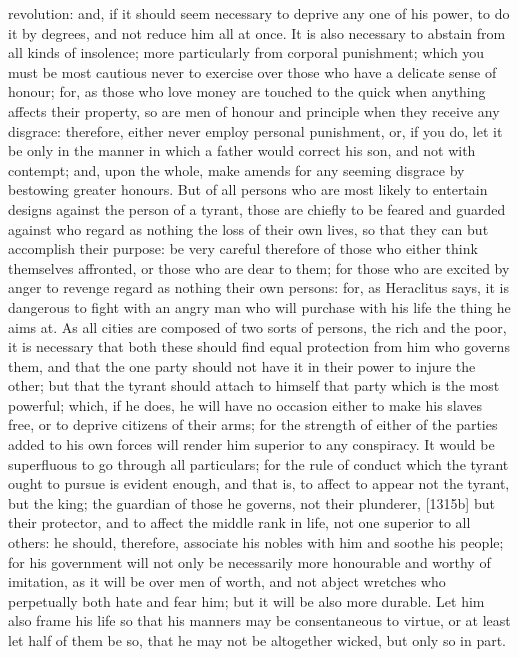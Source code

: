 revolution: and, if it should seem necessary to deprive any one of his
power, to do it by degrees, and not reduce him all at once. It is also
necessary to abstain from all kinds of insolence; more particularly from
corporal punishment; which you must be most cautious never to exercise
over those who have a delicate sense of honour; for, as those who love
money are touched to the quick when anything affects their property, so
are men of honour and principle when they receive any disgrace: therefore,
either never employ personal punishment, or, if you do, let it be only in
the manner in which a father would correct his son, and not with contempt;
and, upon the whole, make amends for any seeming disgrace by bestowing
greater honours. But of all persons who are most likely to entertain
designs against the person of a tyrant, those are chiefly to be feared and
guarded against who regard as nothing the loss of their own lives, so that
they can but accomplish their purpose: be very careful therefore of those
who either think themselves affronted, or those who are dear to them; for
those who are excited by anger to revenge regard as nothing their own
persons: for, as Heraclitus says, it is dangerous to fight with an angry
man who will purchase with his life the thing he aims at. As all cities
are composed of two sorts of persons, the rich and the poor, it is
necessary that both these should find equal protection from him who
governs them, and that the one party should not have it in their power to
injure the other; but that the tyrant should attach to himself that party
which is the most powerful; which, if he does, he will have no occasion
either to make his slaves free, or to deprive citizens of their arms; for
the strength of either of the parties added to his own forces will render
him superior to any conspiracy. It would be superfluous to go through all
particulars; for the rule of conduct which the tyrant ought to pursue is
evident enough, and that is, to affect to appear not the tyrant, but the
king; the guardian of those he governs, not their plunderer, [1315b] but
their protector, and to affect the middle rank in life, not one superior
to all others: he should, therefore, associate his nobles with him and
soothe his people; for his government will not only be necessarily more
honourable and worthy of imitation, as it will be over men of worth, and
not abject wretches who perpetually both hate and fear him; but it will be
also more durable. Let him also frame his life so that his manners may be
consentaneous to virtue, or at least let half of them be so, that he may
not be altogether wicked, but only so in part.

